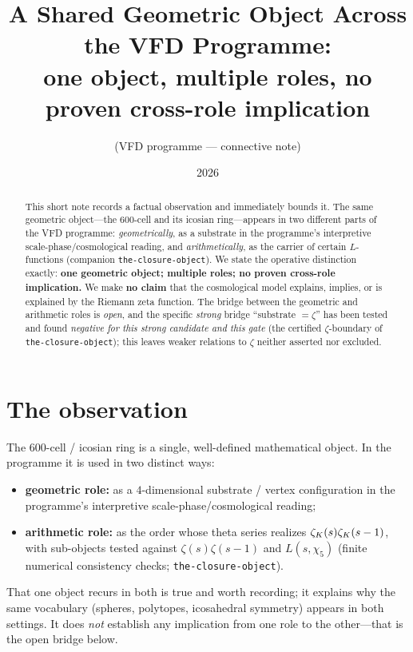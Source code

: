 \documentclass[11pt]{article}
\title{A Shared Geometric Object Across the VFD Programme:\\ one object, multiple roles,
no proven cross-role implication}
\author{(VFD programme --- connective note)}
\date{2026}
\begin{document}
\maketitle

\begin{abstract}
This short note records a factual observation and immediately bounds it. The same
geometric object---the $600$-cell and its icosian ring---appears in two different
parts of the VFD programme: \emph{geometrically}, as a substrate in the programme's
interpretive scale-phase/cosmological reading, and \emph{arithmetically}, as the carrier
of certain
$L$-functions (companion \texttt{the-closure-object}). We state the operative
distinction exactly: \textbf{one geometric object; multiple roles; no proven cross-role
implication.} We make \textbf{no claim} that the cosmological model explains, implies,
or is explained by the Riemann zeta function. The bridge between the geometric and
arithmetic roles is \emph{open}, and the specific \emph{strong} bridge
``substrate $=\zeta$'' has been tested and found \emph{negative for this strong candidate
and this gate} (the certified $\zeta$-boundary of \texttt{the-closure-object}); this
leaves weaker relations to $\zeta$ neither asserted nor excluded.
\end{abstract}

\section{The observation}
The $600$-cell / icosian ring is a single, well-defined mathematical object. In the
programme it is used in two distinct ways:
\begin{itemize}
  \item \textbf{geometric role:} as a $4$-dimensional substrate / vertex
  configuration in the programme's interpretive scale-phase/cosmological reading;
  \item \textbf{arithmetic role:} as the order whose theta series realizes
  $\zeta_{K}(s)\zeta_{K}(s-1)$, with sub-objects tested against $\zeta(s)\zeta(s-1)$ and
  $L(s,\chi_5)$ (finite numerical consistency checks; \texttt{the-closure-object}).
\end{itemize}
That one object recurs in both is true and worth recording; it explains why the same
vocabulary (spheres, polytopes, icosahedral symmetry) appears in both settings. It does
\emph{not} establish any implication from one role to the other---that is the open
bridge below.
\end{document}
